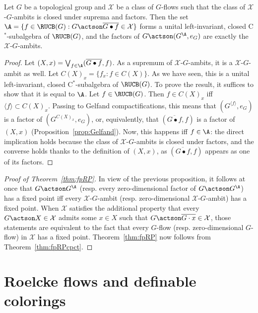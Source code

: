 \begin{prop}\label{prop:KA}
Let $G$ be a topological group and $\mathcal X$ be a class of $G$-flows such that the class of $\mathcal X$-$G$-ambits is closed under suprema and factors. Then the set $\A=\{ f\in \RUCB(G) : G\actson \overline{G\bullet f} \in \mathcal X\}$ forms a unital left-invariant, closed C$^{*}$-subalgebra of $\RUCB(G)$, and the factors of $G\actson(G^{\A}, e_{G})$ are exactly the $\mathcal X$-$G$-ambits.
\end{prop}

\begin{proof}
Let $(X,x)=\bigvee_{f\in \A}(\overline{G\bullet f},f)$. As a supremum of $\mathcal X$-$G$-ambits, it is a $\mathcal X$-$G$-ambit as well. Let $C(X)_{x} = \{ f_{x}:f\in C(X)\}$. As we have seen, this is a unital left-invariant, closed C$^{*}$-subalgebra of $\RUCB(G)$. To prove the result, it suffices to show that it is equal to $\A$. Let $f\in \RUCB(G)$. Then $f\in C(X)_{x}$ iff $\langle f\rangle \subset C(X)_{x}$. Passing to Gelfand compactifications, this means that $(G^{\langle f \rangle},e_{G})$ is a factor of $(G^{C(X)_{x}},e_{G})$, or, equivalently, that $(\overline{G\bullet f},f)$ is a factor of $(X,x)$ (Proposition~\ref{prop:Gelfand}). Now, this happens iff $f\in \A$: the direct implication holds because the class of $\mathcal X$-$G$-ambits is closed under factors, and the converse holds thanks to the definition of $(X,x)$, as $(\overline{G\bullet f},f)$ appears as one of its factors.
\end{proof}

\begin{proof}[Proof of Theorem~\ref{thm:fpRP}]\label{proofofthm}
In view of the previous proposition, it follows at once that $G\actson G^{\A}$ (resp. every zero-dimensional factor of $G\actson G^{\A}$) has a fixed point iff every $\mathcal X$-$G$-ambit (resp. zero-dimensional $\mathcal X$-$G$-ambit) has a fixed point. When $\mathcal X$ satisfies the additional property that every $G\actson X\in \mathcal X$ admits some $x\in X$ such that $G\actson \overline{G\cdot x}\in \mathcal X$, those statements are equivalent to the fact that every $G$-flow (resp. zero-dimensional $G$-flow) in $\mathcal X$ has a fixed point. Theorem~\ref{thm:fpRP} now follows from Theorem~\ref{thm:fpRPcpct}.
\end{proof}

\section{Roelcke flows and definable colorings}
\label{section:Roelcke}

